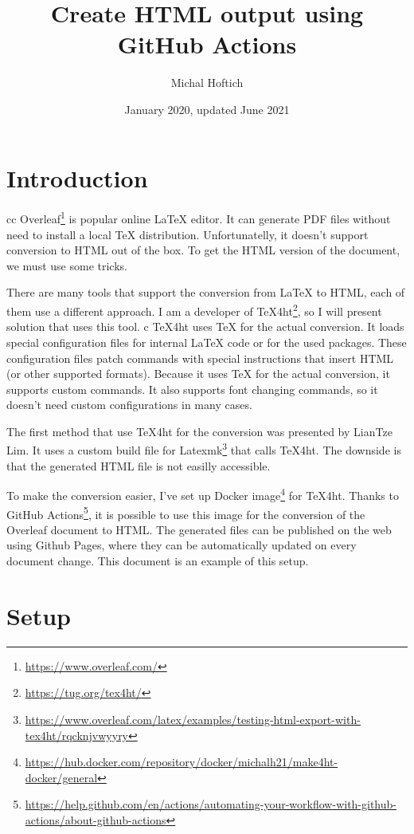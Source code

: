 \documentclass{article}
\title{Create HTML output using GitHub Actions}
\author{Michal Hoftich}
\date{January 2020, updated June 2021}
\newcommand\footurl[1]{\footnote{\url{#1}}}
\newcommand\urllink[2]{#1\footurl{#2}}
\begin{document}
\maketitle

\section{Introduction}
cc
\urllink{Overleaf}{https://www.overleaf.com/} is popular online \LaTeX{}
editor. It can generate PDF files 
without need to install a local \TeX{} distribution. Unfortunatelly, it doesn't
support conversion to HTML out of the box. To get the HTML version of the
document, we must use some tricks.

There are many tools that support the conversion from \LaTeX{} to HTML, each of
them use a different approach. I am a developer of
\urllink{\TeX4ht}{https://tug.org/tex4ht/}, so I will present solution that
uses this tool. 
c
\TeX4ht uses \TeX{} for the actual conversion. It loads special configuration
files for internal \LaTeX{} code or for the used packages. These configuration
files patch commands with special instructions that insert HTML (or other
supported formats). Because it uses \TeX{} for the actual conversion, it
supports custom commands. It also supports font changing commands, so  it
doesn't need custom configurations in many cases.

The first method that use \TeX4ht for the conversion was presented by LianTze
Lim. It uses a custom build file for
\urllink{Latexmk}{https://www.overleaf.com/latex/examples/testing-html-export-with-tex4ht/rqcknjvwyyry} 
that calls \TeX4ht. The downside is that the generated HTML file is not easilly accessible.  

To make the conversion easier, I've set up \urllink{Docker image}{https://hub.docker.com/repository/docker/michalh21/make4ht-docker/general} for \TeX4ht. 
Thanks to \urllink{GitHub Actions}{https://help.github.com/en/actions/automating-your-workflow-with-github-actions/about-github-actions}, 
it is possible to use this image for the conversion of the Overleaf document to HTML. 
The generated files can be published on the web using Github Pages, where they can be automatically 
updated on every document change. This document is an example of this setup.

\section{Setup}
\end{document}
